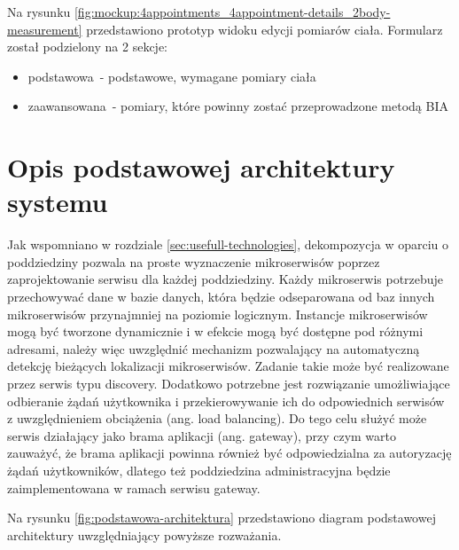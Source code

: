 


Na rysunku \ref{fig:mockup:4appointments_4appointment-details_2body-measurement} przedstawiono prototyp widoku edycji pomiarów ciała.
Formularz został podzielony na 2 sekcje:
\begin{itemize}
    \item podstawowa~- podstawowe, wymagane pomiary ciała
    \item zaawansowana~- pomiary, które powinny zostać przeprowadzone metodą BIA
\end{itemize}



\section{Opis podstawowej architektury systemu}\label{sec:basicArchitecture}

Jak wspomniano w rozdziale \ref{sec:usefull-technologies}, dekompozycja w oparciu o poddziedziny
pozwala na proste wyznaczenie mikroserwisów poprzez zaprojektowanie serwisu dla każdej poddziedziny.
Każdy mikroserwis potrzebuje przechowywać dane w bazie danych, która będzie odseparowana od baz innych mikroserwisów przynajmniej na poziomie logicznym.
Instancje mikroserwisów mogą być tworzone dynamicznie i w efekcie mogą być dostępne pod różnymi adresami,
należy więc uwzględnić mechanizm pozwalający na automatyczną detekcję bieżących lokalizacji mikroserwisów.
Zadanie takie może być realizowane przez serwis typu discovery.
Dodatkowo potrzebne jest rozwiązanie umożliwiające odbieranie żądań użytkownika i przekierowywanie ich do odpowiednich serwisów z uwzględnieniem obciążenia (ang. load balancing).
Do tego celu służyć może serwis działający jako brama aplikacji (ang. gateway), przy czym warto zauważyć, że brama aplikacji powinna również być odpowiedzialna za autoryzację żądań użytkowników,
dlatego też poddziedzina administracyjna będzie zaimplementowana w ramach serwisu gateway.
\par
Na rysunku \ref{fig:podstawowa-architektura} przedstawiono diagram podstawowej architektury uwzględniający powyższe rozważania.

